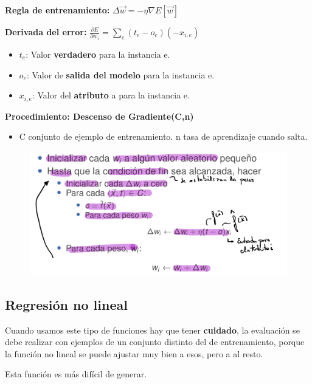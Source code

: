 \documentclass[12pt]{report} %
\begin{document}
\textbf{Regla de entrenamiento:}
\(\Delta \vec{w}=-\eta \nabla E[\vec{w}]\)

\textbf{Derivada del error:}
\(\frac{\partial E}{\partial w_{i}}=\sum_{e}\left(t_{e}-o_{e}\right)\left(-x_{i, e}\right)\)

\begin{itemize}

\item
  \(t_e\): Valor \textbf{verdadero} para la instancia e.
\item
  \(o_e\): Valor de \textbf{salida del modelo} para la instancia e.
\item
  \(x_{i,e}\): Valor del \textbf{atributo} a para la instancia e.
\end{itemize}
\newpage
\textbf{Procedimiento: Descenso de Gradiente(C,n)}

\begin{itemize}

\item
  C conjunto de ejemplo de entrenamiento. n tasa de aprendizaje cuando
  salta.
\end{itemize}

\begin{figure}[H]
	{\includegraphics[scale=.2]{image-20210305224415026.png}}
\end{figure}

\subsection{Regresión no lineal}

Cuando usamos este tipo de funciones hay que tener \textbf{cuidado}, la
evaluación se debe realizar con ejemplos de un conjunto distinto del de
entrenamiento, porque la función no lineal se puede ajustar muy bien a
esos, pero a al resto.

Esta función es más difícil de generar.
\end{document}
